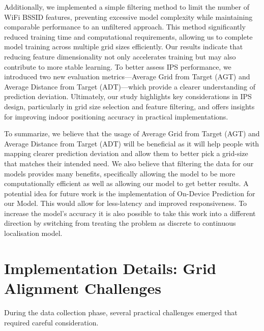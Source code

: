 \documentclass[runningheads]{llncs}
\begin{document}
Additionally, we implemented a simple filtering method to limit the number of WiFi BSSID features, preventing excessive model complexity while maintaining comparable performance to an unfiltered approach. This method significantly reduced training time and computational requirements, allowing us to complete model training across multiple grid sizes efficiently. Our results indicate that reducing feature dimensionality not only accelerates training but may also contribute to more stable learning. To better assess IPS performance, we introduced two new evaluation metrics—Average Grid from Target (AGT) and Average Distance from Target (ADT)—which provide a clearer understanding of prediction deviation. Ultimately, our study highlights key considerations in IPS design, particularly in grid size selection and feature filtering, and offers insights for improving indoor positioning accuracy in practical implementations.

To summarize, we believe that the usage of Average Grid from Target (AGT)
and Average Distance from Target (ADT) will be beneficial as it will help people with mapping clearer prediction deviation and allow them to better pick a grid-size that matches their intended need. We also believe that filtering the data for our models provides many benefits, specifically allowing the model to be more computationally efficient as well as allowing our model to get better results. A potential idea for future work is the implementation of On-Device Prediction for our Model. This would allow for less-latency and improved responsiveness. To increase the model’s accuracy it is also possible to take this work into a different direction by switching from treating the problem as discrete to continuous localisation model.

\nocite{bgp4, add2, add3, add4}



\newpage
\appendix
\section{Implementation Details: Grid Alignment Challenges}

During the data collection phase, several practical challenges emerged that required careful consideration.
\end{document}
